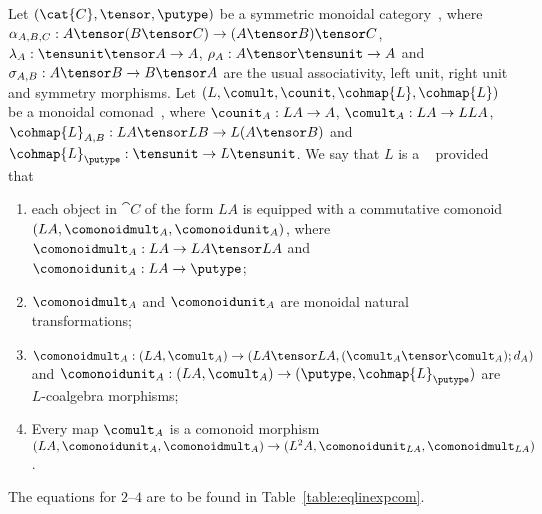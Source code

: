 \documentclass{llncs}
\begin{document}
\begin{definition}\rm
\label{def:lincate}
  Let $(\cat{C},\tensor,\putype)$ be a symmetric monoidal
  category~\cite{maclane98categories},
  where
  $\alpha_{A,B,C}: A\tensor(B\tensor C) \to (A\tensor B)\tensor C$,
  $\lambda_A     : \tensunit\tensor A\to A$,
  $\rho_A        : A\tensor\tensunit \to A$ and
  $\sigma_{A,B}  : A\tensor B\to B\tensor A$
  are the usual associativity, left unit, right unit and symmetry
  morphisms. Let
  $(L,\comult,\counit,\cohmap{L},\cohmap{L})$ be a monoidal
  comonad~\cite{bierman93intuitionistic},
  where $\counit_A:LA\to A$, 
    $\comult_A:LA\to LLA$,
    $\cohmap{L}_{A,B} :LA\tensor LB \to L(A\tensor B)$ and
    $\cohmap{L}_\putype:\tensunit\to L\tensunit$.
  We say that $L$ is a ~\cite{schalk04what} provided that
  \begin{enumerate}
  \item each object in $\cat{C}$ of the form $LA$ is equipped with a
    commutative comonoid $(LA,\comonoidmult_A,\comonoidunit_A)$,
    where
      $\comonoidmult_A:LA\to LA\tensor LA$ and
      $\comonoidunit_A:LA\to \putype$;
  \item
    $\comonoidmult_A$ and
    $\comonoidunit_A$ are monoidal natural
    transformations;
  \item $\comonoidmult_A:(LA,\comult_A)\to(LA\tensor LA,
    (\comult_A\tensor\comult_A);d_A)$ and
    $\comonoidunit_A:(LA,\comult_A)\to 
    (\putype,\cohmap{L}_{\putype})$ are
    $L$-coalgebra morphisms;
  \item Every map $\comult_A$ is a comonoid morphism
    $(LA,\comonoidunit_A,\comonoidmult_A) \to
    (L^2A,\comonoidunit_{LA},
    \comonoidmult_{LA})$.
  \end{enumerate}
  The equations for $2$--$4$ are to be found in
  Table~\ref{table:eqlinexpcom}.
\end{definition}
\end{document}
